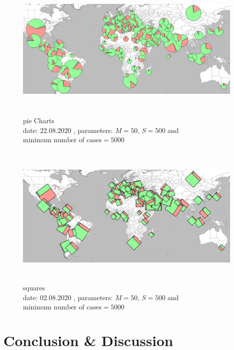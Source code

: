 \documentclass[a4paper,11pt]{article}
\begin{document}
\begin{figure}[h]
  \centering
  \includegraphics[height=7cm]{assets/pieChartsEval}
  \caption{pie Charts\\
    date: 22.08.2020  , parameters: $M=50$, $S=500$ and $\text{minimum number of cases}=5000$  }
\end{figure}

\begin{figure}[h]
  \centering
  \includegraphics[height=7cm]{assets/squaresEval}
  \caption{squares\\
    date: 02.08.2020  , parameters: $M=50$, $S=500$ and $\text{minimum number of cases}=5000$  }
\end{figure}


\section{Conclusion \& Discussion}
\end{document}
